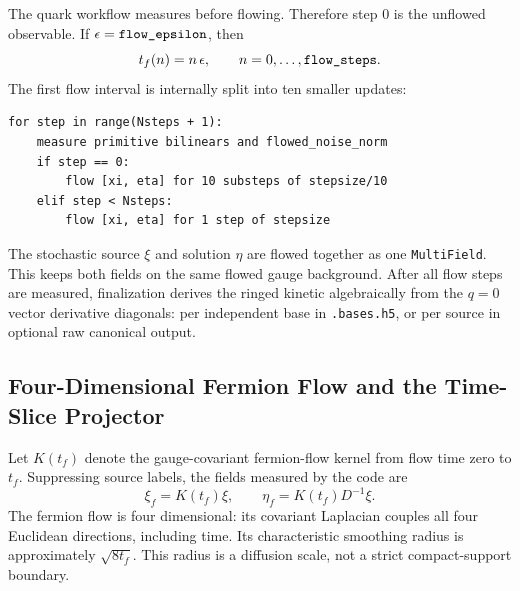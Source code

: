 \documentclass[11pt,a4paper]{article}
\newcommand{\code}[1]{\texttt{\begingroup\def\_{\textunderscore\allowbreak}#1\endgroup}}
\newcommand{\Tf}{t_f}
\begin{document}
The quark workflow measures before flowing.  Therefore step \(0\) is the
unflowed observable.  If \(\epsilon=\code{flow\_epsilon}\), then
\begin{equation}
  \Tf(n) = n\,\epsilon,
  \qquad
  n=0,\ldots,\code{flow\_steps}.
\end{equation}
The first flow interval is internally split into ten smaller updates:
\begin{verbatim}
for step in range(Nsteps + 1):
    measure primitive bilinears and flowed_noise_norm
    if step == 0:
        flow [xi, eta] for 10 substeps of stepsize/10
    elif step < Nsteps:
        flow [xi, eta] for 1 step of stepsize
\end{verbatim}
The stochastic source \(\xi\) and solution \(\eta\) are flowed together as one
\code{MultiField}.  This keeps both fields on the same flowed gauge background.
After all flow steps are measured, finalization derives the ringed kinetic
algebraically from the \(q=0\) vector derivative diagonals: per independent
base in \code{.bases.h5}, or per source in optional raw canonical output.

\subsection{Four-Dimensional Fermion Flow and the Time-Slice Projector}
\label{sec:full_volume_flow_source}

Let \(K(\Tf)\) denote the gauge-covariant fermion-flow kernel from flow time
zero to \(\Tf\).  Suppressing source labels, the fields measured by the code
are
\begin{equation}
  \xi_f = K(\Tf)\xi,
  \qquad
  \eta_f = K(\Tf)D^{-1}\xi.
  \label{eq:flowed_noise_solution}
\end{equation}
The fermion flow is four dimensional: its covariant Laplacian couples all four
Euclidean directions, including time.  Its characteristic smoothing radius is
approximately \(\sqrt{8\Tf}\).  This radius is a diffusion scale, not a strict
compact-support boundary.
\end{document}
